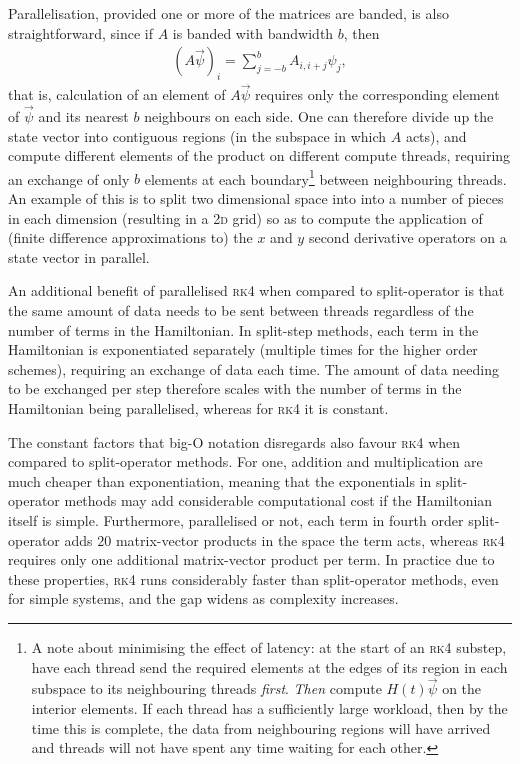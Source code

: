 Parallelisation, provided one or more of the matrices are banded, is also straightforward, since if $A$ is banded with bandwidth $b$, then
\begin{align}
(A \vec \psi)_i = \sum_{j=-b}^b A_{i, i+j} \psi_j,
\end{align}
that is, calculation of an element of $A\vec\psi$ requires only the corresponding element of $\vec \psi$ and its nearest $b$ neighbours on each side. One can therefore divide up the state vector into contiguous regions (in the subspace in which $A$ acts), and compute different elements of the product on different compute threads, requiring an exchange of only $b$ elements at each boundary\footnote{A note about minimising the effect of latency: at the start of an \textsc{rk4} substep, have each thread send the required elements at the edges of its region in each subspace to its neighbouring threads \emph{first}. \emph{Then} compute $H(t)\vec\psi$ on the interior elements. If each thread has a sufficiently large workload, then by the time this is complete, the data from neighbouring regions will have arrived and threads will not have spent any time waiting for each other.} between neighbouring threads. An example of this is to split two dimensional space into into a number of pieces in each dimension (resulting in a 2\textsc{d} grid) so as to compute the application of (finite difference approximations to) the $x$ and $y$ second derivative operators on a state vector in parallel.

An additional benefit of parallelised \textsc{rk4} when compared to split-operator is that the same amount of data needs to be sent between threads regardless of the number of terms in the Hamiltonian. In split-step methods, each term in the Hamiltonian is exponentiated separately (multiple times for the higher order schemes), requiring an exchange of data each time. The amount of data needing to be exchanged per step therefore scales with the number of terms in the Hamiltonian being parallelised, whereas for \textsc{rk4} it is constant.

The constant factors that big-O notation disregards also favour \textsc{rk4} when compared to split-operator methods. For one, addition and multiplication are much cheaper than exponentiation, meaning that the exponentials in split-operator methods may add considerable computational cost if the Hamiltonian itself is simple. Furthermore, parallelised or not, each term in fourth order split-operator adds $20$ matrix-vector products in the space the term acts, whereas \textsc{rk4} requires only one additional matrix-vector product per term. In practice due to these properties, \textsc{rk4} runs considerably faster than split-operator methods, even for simple systems, and the gap widens as complexity increases.


